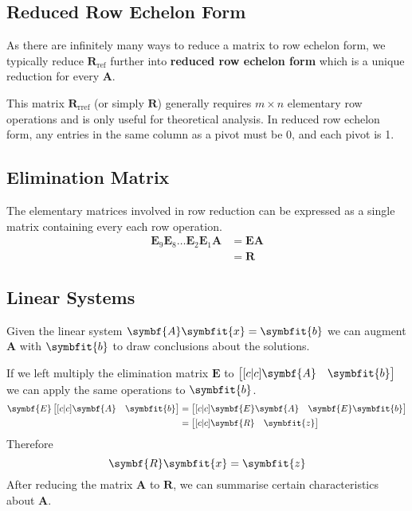 \documentclass{article}
\begin{document}
\subsection{Reduced Row Echelon Form}
As there are infinitely many ways to reduce a matrix to row echelon form, we typically
reduce \(\symbf{R}_{\mathrm{ref}}\) further into \textbf{reduced row echelon form} which is
a unique reduction for every \(\symbf{A}\).

This matrix \(\symbf{R}_{\mathrm{rref}}\) (or simply \(\symbf{R}\)) generally requires \(m \times n\)
elementary row operations and is only useful for theoretical analysis.
In reduced row echelon form, any entries in the same column as a pivot must be 0, and each pivot is 1.
\subsection{Elimination Matrix}
The elementary matrices involved in row reduction can be expressed as a single matrix containing every
each row operation.
\begin{align*}
    \symbf{E}_9 \symbf{E}_8 \dots \symbf{E}_2 \symbf{E}_1 \symbf{A} & = \symbf{E} \symbf{A} \\
                                                                    & = \symbf{R}
\end{align*}
\subsection{Linear Systems}
Given the linear system \(\symbf{A} \symbfit{x} = \symbfit{b}\)
we can augment \(\symbf{A}\) with \(\symbfit{b}\) to draw conclusions about the solutions.

If we left multiply the elimination matrix \(\symbf{E}\) to
\(\begin{bmatrix}[c|c]
    \symbf{A} & \symbfit{b}
\end{bmatrix}\)
we can apply the same operations to \(\symbfit{b}\).
\begin{align*}
    \symbf{E}
    \begin{bmatrix}[c|c]
        \symbf{A} & \symbfit{b}
    \end{bmatrix} & =
    \begin{bmatrix}[c|c]
        \symbf{E} \symbf{A} & \symbf{E} \symbfit{b}
    \end{bmatrix}          \\
                             & = \begin{bmatrix}[c|c]
                                     \symbf{R} & \symbfit{z}
                                 \end{bmatrix}
\end{align*}
Therefore
\begin{equation*}
    \symbf{R} \symbfit{x} = \symbfit{z}
\end{equation*}
After reducing the matrix \(\symbf{A}\) to \(\symbf{R}\), we can summarise
certain characteristics about \(\symbf{A}\).
\end{document}
